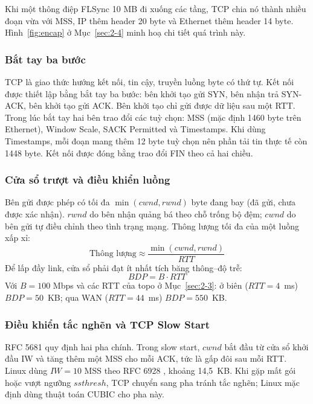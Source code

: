 Khi một thông điệp FLSync 10 MB đi xuống các tầng, TCP chia nó thành nhiều đoạn vừa với MSS, IP thêm header 20 byte và Ethernet thêm header 14 byte. Hình~\ref{fig:encap} ở Mục~\ref{sec:2-4} minh hoạ chi tiết quá trình này.

\subsubsection{Bắt tay ba bước}
TCP \cite{rfc9293} là giao thức hướng kết nối, tin cậy, truyền luồng byte có thứ tự. Kết nối được thiết lập bằng bắt tay ba bước: bên khởi tạo gửi SYN, bên nhận trả SYN-ACK, bên khởi tạo gửi ACK. Bên khởi tạo chỉ gửi được dữ liệu sau một RTT. Trong lúc bắt tay hai bên trao đổi các tuỳ chọn: MSS (mặc định 1460 byte trên Ethernet), Window Scale, SACK Permitted và Timestamps. Khi dùng Timestamps, mỗi đoạn mang thêm 12 byte tuỳ chọn nên phần tải tin thực tế còn 1448 byte. Kết nối được đóng bằng trao đổi FIN theo cả hai chiều.

\subsubsection{Cửa sổ trượt và điều khiển luồng}
Bên gửi được phép có tối đa $\min(cwnd, rwnd)$ byte đang bay (đã gửi, chưa được xác nhận). $rwnd$ do bên nhận quảng bá theo chỗ trống bộ đệm; $cwnd$ do bên gửi tự điều chỉnh theo tình trạng mạng. Thông lượng tối đa của một luồng xấp xỉ:
\begin{equation}
    \text{Thông lượng} \approx \frac{\min(cwnd, rwnd)}{RTT}
    \label{eq:tput}
\end{equation}
Để lấp đầy link, cửa sổ phải đạt ít nhất tích băng thông--độ trễ:
\begin{equation}
    BDP = B \cdot RTT
    \label{eq:bdp}
\end{equation}
Với $B = 100$ Mbps và các RTT của topo ở Mục~\ref{sec:2-3}: ở biên ($RTT = 4$~ms) $BDP = 50$~KB; qua WAN ($RTT = 44$~ms) $BDP = 550$~KB.

\subsubsection{Điều khiển tắc nghẽn và TCP Slow Start}
RFC 5681 \cite{rfc5681} quy định hai pha chính. Trong slow start, $cwnd$ bắt đầu từ cửa sổ khởi đầu IW và tăng thêm một MSS cho mỗi ACK, tức là gấp đôi sau mỗi RTT. Linux dùng $IW = 10$ MSS theo RFC 6928 \cite{rfc6928}, khoảng 14{,}5~KB. Khi gặp mất gói hoặc vượt ngưỡng $ssthresh$, TCP chuyển sang pha tránh tắc nghẽn; Linux mặc định dùng thuật toán CUBIC \cite{rfc9438} cho pha này.

